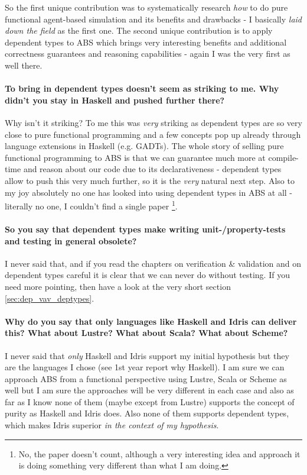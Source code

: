 So the first unique contribution was to systematically research \textit{how} to do pure functional agent-based simulation and its benefits and drawbacks - I basically \textit{laid down the field} as the first one.
The second unique contribution is to apply dependent types to ABS which brings very interesting benefits and additional correctness guarantees and reasoning capabilities - again I was the very first as well there.

\paragraph{To bring in dependent types doesn't seem as striking to me. Why didn't you stay in Haskell and pushed further there?}
Why isn't it striking? To me this was \textit{very} striking as dependent types are so very close to pure functional programming and a few concepts pop up already through language extensions in Haskell (e.g. GADTs). The whole story of selling pure functional programming to ABS is that we can guarantee much more at compile-time and reason about our code due to its declarativeness - dependent types allow to push this very much further, so it is the \textit{very} natural next step. Also to my joy absolutely no one has looked into using dependent types in ABS at all - literally no one, I couldn't find a single paper \footnote{No, the paper \cite{botta_functional_2011} doesn't count, although a very interesting idea and approach it is doing something very different than what I am doing.}.

\paragraph{So you say that dependent types make writing unit-/property-tests and testing in general obsolete?}
I never said that, and if you read the chapters on verification \& validation and on dependent types careful it is clear that we can never do without testing. If you need more pointing, then have a look at the very short section \ref{sec:dep_vav_deptypes}.

\paragraph{Why do you say that only languages like Haskell and Idris can deliver this? What about Lustre? What about Scala? What about Scheme?}
I never said that \textit{only} Haskell and Idris support my initial hypothesis but they are the languages I chose (see 1st year report why Haskell). I am sure we can approach ABS from a functional perspective using Lustre, Scala or Scheme as well but I am sure the approaches will be very different in each case and also as far as I know none of them (maybe except from Lustre) supports the concept of purity as Haskell and Idris does. Also none of them supports dependent types, which makes Idris superior \textit{in the context of my hypothesis}.

